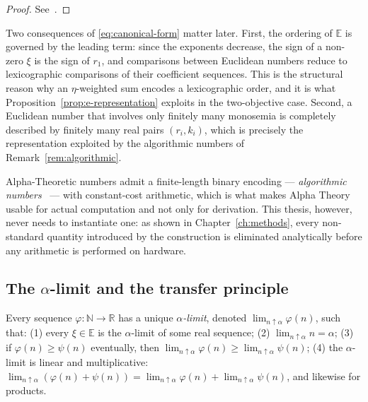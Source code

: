 \begin{proof}
See~\cite{benci2019measure,benci2022nonstandard}.
\end{proof}

Two consequences of \eqref{eq:canonical-form} matter later. First, the ordering of
$\mathbb{E}$ is governed by the leading term: since the exponents decrease, the sign
of a non-zero $\xi$ is the sign of $r_1$, and comparisons between Euclidean numbers
reduce to lexicographic comparisons of their coefficient sequences. This is the
structural reason why an $\eta$-weighted sum encodes a lexicographic order, and it is
what Proposition~\ref{prop:e-representation} exploits in the two-objective case.
Second, a Euclidean number that involves only finitely many monosemia is completely
described by finitely many real pairs $(r_i,k_i)$, which is precisely the
representation exploited by the algorithmic numbers of
Remark~\ref{rem:algorithmic}.

\begin{remark}
\label{rem:algorithmic}
Alpha-Theoretic numbers admit a finite-length binary
encoding --- \emph{algorithmic numbers}~\cite{benci2020algorithmic} --- with
constant-cost arithmetic, which is what makes Alpha Theory usable for actual
computation and not only for derivation. This thesis, however, never needs to
instantiate one: as shown in Chapter~\ref{ch:methods}, every non-standard quantity
introduced by the construction is eliminated analytically before any arithmetic is
performed on hardware.
\end{remark}

\subsection{The \texorpdfstring{$\alpha$}{alpha}-limit and the transfer principle}
\label{sec:transfer}

\begin{axiom}
\label{ax:alphalimit}
Every sequence $\varphi : \mathbb{N} \to \mathbb{R}$ has a unique
\emph{$\alpha$-limit}, denoted $\lim_{n \uparrow \alpha} \varphi(n)$, such that:
(1) every $\xi \in \mathbb{E}$ is the $\alpha$-limit of some real sequence;
(2) $\lim_{n \uparrow \alpha} n = \alpha$;
(3) if $\varphi(n) \ge \psi(n)$ eventually, then
$\lim_{n \uparrow \alpha} \varphi(n) \ge \lim_{n \uparrow \alpha} \psi(n)$;
(4) the $\alpha$-limit is linear and multiplicative:
$\lim_{n \uparrow \alpha}(\varphi(n)+\psi(n)) = \lim_{n \uparrow \alpha}\varphi(n) + \lim_{n \uparrow \alpha}\psi(n)$,
and likewise for products.
\end{axiom}

